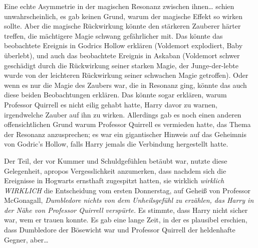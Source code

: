 Eine echte Asymmetrie in der magischen Resonanz zwischen ihnen… schien unwahrscheinlich, es gab keinen Grund, warum der magische Effekt so wirken sollte. Aber die magische Rückwirkung könnte den stärkeren Zauberer härter treffen, die mächtigere Magie schwang gefährlicher mit. Das könnte das beobachtete Ereignis in Godrics Hollow erklären (Voldemort explodiert, Baby überlebt), und auch das beobachtete Ereignis in Askaban (Voldemort schwer geschädigt durch die Rückwirkung seiner starken Magie, der Junge-der-lebte wurde von der leichteren Rückwirkung seiner schwachen Magie getroffen). Oder wenn es nur die Magie des Zaubers war, die in Resonanz ging, könnte das auch diese beiden Beobachtungen erklären. Das könnte sogar erklären, warum Professor Quirrell es nicht eilig gehabt hatte, Harry davor zu warnen, irgendwelche Zauber auf ihn zu wirken.
Allerdings gab es noch einen anderen offensichtlichen Grund warum Professor Quirrell es vermieden hatte, das Thema der Resonanz anzusprechen; es war ein gigantischer Hinweis auf das Geheimnis von Godric's Hollow, falls Harry jemals die Verbindung hergestellt hatte.

Der Teil, der vor Kummer und Schuldgefühlen betäubt war, nutzte diese Gelegenheit, apropos Vergesslichkeit anzumerken, dass nachdem sich die Ereignisse in Hogwarts ernsthaft zugespitzt hatten,
sie wirklich \emph{wirklich WIRKLICH} die Entscheidung vom ersten Donnerstag, auf Geheiß von Professor McGonagall, \emph{Dumbledore nichts von dem Unheilsgefühl zu erzählen, das Harry in der Nähe von Professor Quirrell verspürte.} Es stimmte, dass Harry nicht sicher war, wem er trauen konnte. Es gab eine lange Zeit, in der es plausibel erschien, dass Dumbledore der Bösewicht war und Professor Quirrell der heldenhafte Gegner, aber…

